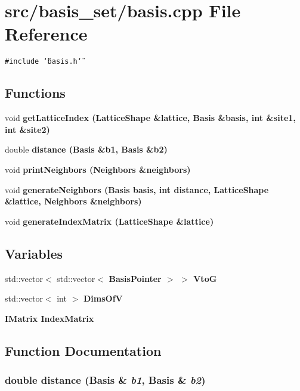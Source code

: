 \section{src/basis\_\-set/basis.cpp File Reference}
\label{basis_8cpp}
{\tt \#include \char`\"{}basis.h\char`\"{}}\par
\subsection*{Functions}
\begin{CompactItemize}
\item 
void \bf{get\-Lattice\-Index} (\bf{Lattice\-Shape} \&lattice, \bf{Basis} \&basis, int \&site1, int \&site2)
\item 
double \bf{distance} (\bf{Basis} \&b1, \bf{Basis} \&b2)
\item 
void \bf{print\-Neighbors} (\bf{Neighbors} \&neighbors)
\item 
void \bf{generate\-Neighbors} (\bf{Basis} basis, int distance, \bf{Lattice\-Shape} \&lattice, \bf{Neighbors} \&neighbors)
\item 
void \bf{generate\-Index\-Matrix} (\bf{Lattice\-Shape} \&lattice)
\end{CompactItemize}
\subsection*{Variables}
\begin{CompactItemize}
\item 
std::vector$<$ std::vector$<$ \bf{Basis\-Pointer} $>$ $>$ \bf{Vto\-G}
\item 
std::vector$<$ int $>$ \bf{Dims\-Of\-V}
\item 
\bf{IMatrix} \bf{Index\-Matrix}
\end{CompactItemize}


\subsection{Function Documentation}
\subsubsection{\setlength{\rightskip}{0pt plus 5cm}double distance (\bf{Basis} \& {\em b1}, \bf{Basis} \& {\em b2})}\label{basis_8cpp_e9c7fa4f242e67d65fcefe7f853523f8}


